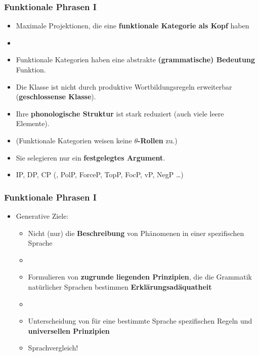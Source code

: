 \begin{frame}
\frametitle{Funktionale Phrasen I}

\begin{itemize}
	\item Maximale Projektionen, die eine \textbf{funktionale Kategorie als Kopf} haben
	\item[]
	\item Funktionale Kategorien haben eine abstrakte \textbf{(grammatische) Bedeutung} \ras Funktion.
	\item Die Klasse ist nicht durch produktive Wortbildungsregeln erweiterbar (\textbf{geschlossense Klasse}).
	\item Ihre \textbf{phonologische Struktur} ist stark reduziert (\ras auch viele leere Elemente).
	\item (Funktionale Kategorien weisen keine \textbf{$\theta$-Rollen} zu.)
	\item Sie selegieren nur ein \textbf{festgelegtes Argument}.
	\item \alert{IP, DP, CP} (, PolP, ForceP, TopP, FocP, vP, NegP \dots )
		
\end{itemize}

\end{frame}


\begin{frame}
\frametitle{Funktionale Phrasen I}

\begin{itemize}
	\item Generative Ziele: \citep[vgl.][]{Haegeman94a}
	\begin{itemize}
		\item Nicht (nur) die \textbf{Beschreibung} von Phänomenen in einer spezifischen Sprache
		\item[]
		\item Formulieren von \textbf{zugrunde liegenden Prinzipien}, die die Grammatik natürlicher Sprachen bestimmen \ras \textbf{Erklärungsadäquatheit}
		\item[]
		\item Unterscheidung von für eine bestimmte Sprache spezifischen Regeln und \textbf{universellen Prinzipien}
		\item[\ra] Sprachvergleich!
	\end{itemize}
	
\end{itemize}

\end{frame}


